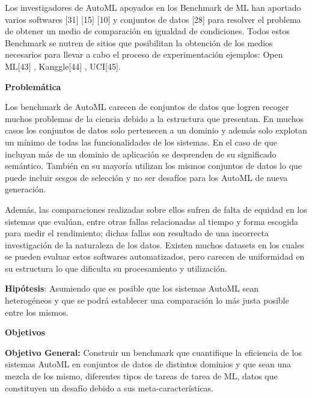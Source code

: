 Los investigadores de AutoML apoyados en los Benchmark de ML han aportado varios softwares [31] [15] [10] y conjuntos de datos [28] 
para resolver el problema de obtener un medio de comparación en igualdad de condiciones. Todos estos Benchmark se nutren de sitios 
que posibilitan la obtención de los medios necesarios para llevar a cabo el proceso de experimentación ejemplos: Open ML[43] , 
Kanggle[44] , UCI[45].

\begin{flushleft} 
    {\Large { \textbf{Problemática}}}
\end{flushleft}
Los benchmark de AutoML carecen de conjuntos de datos que logren recoger muchos problemas de la ciencia debido 
a la estructura que presentan. En muchos casos los conjuntos de datos solo pertenecen a un dominio y además solo explotan un mínimo de todas las funcionalidades de 
los sistemas. En el caso de que incluyan más de un dominio de aplicación se desprenden de su significado semántico. También en su mayoría 
utilizan los mismos conjuntos de datos lo que puede incluir sesgos de selección y no ser desafíos para los AutoML de nueva generación.

Además, las comparaciones realizadas sobre ellos sufren de falta de equidad en los sistemas que evalúan, entre otras fallas 
relacionadas al tiempo y forma escogida para medir el rendimiento; dichas fallas son resultado de una incorrecta investigación de la 
naturaleza de los datos. Existen muchos datasets en los cuales se pueden evaluar estos softwares automatizados, pero carecen de 
uniformidad en su estructura lo que dificulta su procesamiento y utilización.


\textbf{Hipótesis}: Asumiendo que es posible que los sistemas AutoML sean heterogéneos y que se podrá establecer una comparación lo más 
justa posible entre los mismos.

\begin{flushleft} 
    {\Large {\textbf{Objetivos}}}
\end{flushleft}

\textbf{Objetivo General:} Construir un benchmark que cuantifique la eficiencia de los sistemas AutoML en conjuntos de datos de distintos dominios y 
que sean una mezcla de los mismo, 
diferentes tipos de tareas de tarea de ML, datos que constituyen un desafío debido a sus meta-características.\newline

